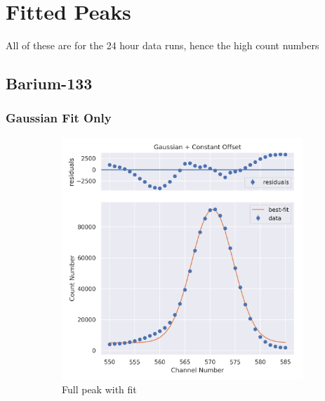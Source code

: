 \documentclass[11pt,a4paper]{article}
\begin{document}
\clearpage

\section{Fitted Peaks}

All of these are for the 24 hour data runs, hence the high count numbers

\subsection{Barium-133}
\subsubsection{Gaussian Fit Only}
\begin{figure}[H]
  \centering
  \begin{subfigure}{.5\linewidth}
    \centering
    \includegraphics[width=\linewidth]{./Images/Barium133/Gauss/Gauss_1_Full.png}
    \caption{Full peak with fit}
  \end{subfigure}%
  \begin{subfigure}{.5\linewidth}
    \centering

\end{subfigure}
\end{figure}
\end{document}
